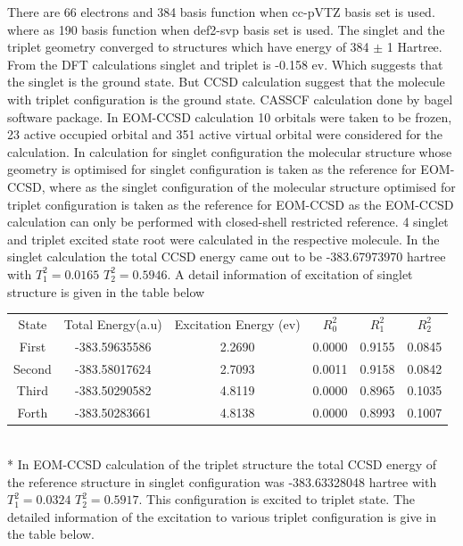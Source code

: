 \documentclass{article}
\begin{document}
There are 66 electrons and 384 basis function when cc-pVTZ basis set is used. where as 190 basis function when def2-svp basis set is used. The singlet and the triplet geometry converged to structures which have energy of 384 \(\pm\) 1 Hartree. From the DFT calculations singlet and triplet is -0.158 ev. Which suggests that the singlet is the ground state. But CCSD calculation suggest that the molecule with triplet configuration is the ground state. CASSCF calculation done by bagel software package. 
In EOM-CCSD calculation 10 orbitals were taken to be frozen, 23 active occupied orbital and 351 active virtual orbital were considered for the calculation. In calculation for singlet configuration the molecular structure whose geometry is optimised for singlet configuration is taken as the reference for EOM-CCSD, where as the singlet configuration of the molecular structure optimised for triplet configuration is taken as the reference for EOM-CCSD as the EOM-CCSD calculation can only be performed with closed-shell restricted reference. 4 singlet and triplet excited state root were calculated in the respective molecule.
In the singlet calculation the total CCSD energy came out to be -383.67973970 hartree  with \( T _{1}^{2} = 0.0165\) \(T _{2}^{2} = 0.5946 \). A detail information of excitation of singlet structure is given in the table below

 \label{tab:title} 
\begin{tabular}{c c c c c c}
    State & Total Energy(a.u) & Excitation Energy (ev) & \(R_{0}^{2}\) & \(R_{1}^{2}\) & \(R_{2}^{2}\)\\
    First & -383.59635586 & 2.2690 & 0.0000 & 0.9155 & 0.0845 \\
    Second& -383.58017624 & 2.7093 & 0.0011 & 0.9158 & 0.0842 \\
    Third & -383.50290582 & 4.8119 & 0.0000 & 0.8965 & 0.1035 \\
    Forth & -383.50283661 & 4.8138 & 0.0000 & 0.8993 & 0.1007 \\
\end{tabular}\\*
In EOM-CCSD calculation of the triplet structure the total CCSD energy of the reference structure in singlet configuration was -383.63328048 hartree with \( T _{1}^{2} = 0.0324\) \(T _{2}^{2} = 0.5917 \). This configuration is excited to triplet state. The detailed information of the excitation to various triplet configuration is give in the table below.
\end{document}
